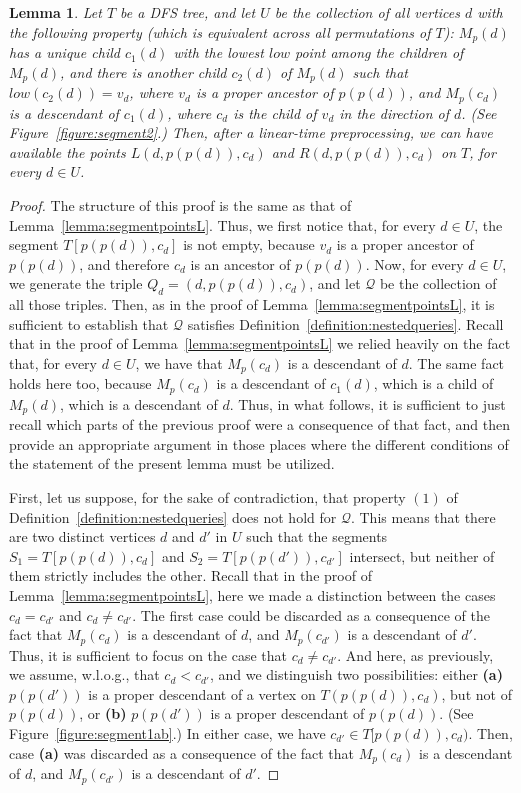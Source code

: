 \documentclass[11pt,a4paper]{article}
\newtheorem{lemma}[theorem]{Lemma}
\begin{document}
\begin{lemma}
\label{lemma:segmentpointslow}
Let $T$ be a DFS tree, and let $U$ be the collection of all vertices $d$ with the following property (which is equivalent across all permutations of $T$): $M_p(d)$ has a unique child $c_1(d)$ with the lowest $\mathit{low}$ point among the children of $M_p(d)$, and there is another child $c_2(d)$ of $M_p(d)$ such that $\mathit{low}(c_2(d))=v_d$, where $v_d$ is a proper ancestor of $p(p(d))$, and $M_p(c_d)$ is a descendant of $c_1(d)$, where $c_d$ is the child of $v_d$ in the direction of $d$. (See Figure~\ref{figure:segment2}.) Then, after a linear-time preprocessing, we can have available the points $L(d,p(p(d)),c_d)$ and $R(d,p(p(d)),c_d)$ on $T$, for every $d\in U$.
\end{lemma}
\begin{proof}
The structure of this proof is the same as that of Lemma~\ref{lemma:segmentpointsL}. Thus, we first notice that, for every $d\in U$, the segment $T[p(p(d)),c_d]$ is not empty, because $v_d$ is a proper ancestor of $p(p(d))$, and therefore $c_d$ is an ancestor of $p(p(d))$. Now, for every $d\in U$, we generate the triple $Q_d=(d,p(p(d)),c_d)$, and let $\mathcal{Q}$ be the collection of all those triples. Then, as in the proof of Lemma~\ref{lemma:segmentpointsL}, it is sufficient to establish that $\mathcal{Q}$ satisfies Definition~\ref{definition:nestedqueries}. Recall that in the proof of Lemma~\ref{lemma:segmentpointsL} we relied heavily on the fact that, for every $d\in U$, we have that $M_p(c_d)$ is a descendant of $d$. The same fact holds here too, because $M_p(c_d)$ is a descendant of $c_1(d)$, which is a child of $M_p(d)$, which is a descendant of $d$. Thus, in what follows, it is sufficient to just recall which parts of the previous proof were a consequence of that fact, and then provide an appropriate argument in those places where the different conditions of the statement of the present lemma must be utilized.

First, let us suppose, for the sake of contradiction, that property $(1)$ of Definition~\ref{definition:nestedqueries} does not hold for $\mathcal{Q}$. This means that there are two distinct vertices $d$ and $d'$ in $U$ such that the segments $S_1=T[p(p(d)),c_d]$ and $S_2=T[p(p(d')),c_{d'}]$ intersect, but neither of them strictly includes the other. Recall that in the proof of Lemma~\ref{lemma:segmentpointsL}, here we made a distinction between the cases $c_d=c_{d'}$ and $c_d\neq c_{d'}$. The first case could be discarded as a consequence of the fact that $M_p(c_d)$ is a descendant of $d$, and $M_p(c_{d'})$ is a descendant of $d'$. Thus, it is sufficient to focus on the case that $c_d\neq c_{d'}$. And here, as previously, we assume, w.l.o.g., that $c_d<c_{d'}$, and we distinguish two possibilities: either \textbf{(a)} $p(p(d'))$ is a proper descendant of a vertex on $T(p(p(d)),c_d)$, but not of $p(p(d))$, or \textbf{(b)} $p(p(d'))$ is a proper descendant of $p(p(d))$. (See Figure~\ref{figure:segment1ab}.) In either case, we have $c_{d'}\in T[p(p(d)),c_d)$. Then, case \textbf{(a)} was discarded as a consequence of the fact that $M_p(c_d)$ is a descendant of $d$, and $M_p(c_{d'})$ is a descendant of $d'$.


\end{proof}
\end{document}
